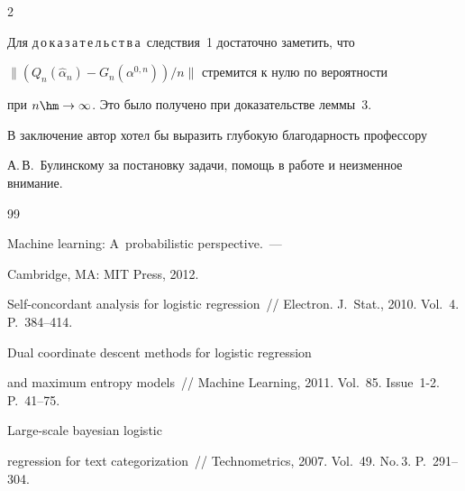 \begin{multicols}{2}
\noindent


Для д\,о\,к\,а\,з\,а\,т\,е\,л\,ь\,с\,т\,в\,а\ следствия~1 достаточно заметить, что 


$\|(Q_n(\widehat{\alpha}_n)-G_n(\alpha^{0,n}))/n\|$ стремится к нулю по вероятности 


при $n\hm\rightarrow\infty$. Это было получено при доказательстве леммы~3.





\bigskip





В заключение автор хотел бы выразить глубокую благодарность профессору 


А.\,В.~Булинскому за постановку задачи, помощь в работе и неизменное внимание.





{\small\frenchspacing


{%




\begin{thebibliography}{99}










 Machine learning: A~probabilistic perspective.~--- 


Cambridge, MA: MIT Press, 2012.




 Self-concordant analysis for logistic regression~//  Electron. J.~Stat., 2010. Vol.~4. P.~384--414.




 Dual coordinate descent methods for logistic regression 


and maximum entropy models~// Machine Learning, 2011. Vol.~85. Issue~1-2. P.~41--75.







 Large-scale bayesian logistic 


regression for text categorization~// Technometrics, 2007. Vol.~49. No.\,3. P.~291--304.






\end{thebibliography}}}
\end{multicols}
